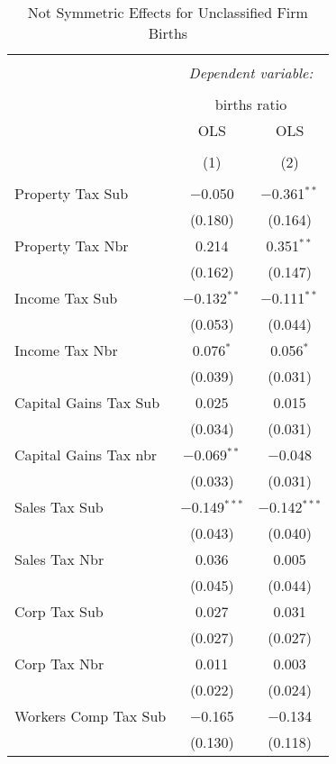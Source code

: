 
\begin{table}[!htbp] \centering 
  \caption{Not Symmetric Effects for  Unclassified Firm Births} 
  \label{99noequality} 
\begin{tabular}{@{\extracolsep{5pt}}lcc} 
\\[-1.8ex]\hline 
\hline \\[-1.8ex] 
 & \multicolumn{2}{c}{\textit{Dependent variable:}} \\ 
\cline{2-3} 
\\[-1.8ex] & \multicolumn{2}{c}{births ratio} \\ 
 & OLS & OLS \\ 
\\[-1.8ex] & (1) & (2)\\ 
\hline \\[-1.8ex] 
 Property Tax Sub & $-$0.050 & $-$0.361$^{**}$ \\ 
  & (0.180) & (0.164) \\ 
  Property Tax Nbr & 0.214 & 0.351$^{**}$ \\ 
  & (0.162) & (0.147) \\ 
  Income Tax Sub & $-$0.132$^{**}$ & $-$0.111$^{**}$ \\ 
  & (0.053) & (0.044) \\ 
  Income Tax Nbr & 0.076$^{*}$ & 0.056$^{*}$ \\ 
  & (0.039) & (0.031) \\ 
  Capital Gains Tax Sub & 0.025 & 0.015 \\ 
  & (0.034) & (0.031) \\ 
  Capital Gains Tax nbr & $-$0.069$^{**}$ & $-$0.048 \\ 
  & (0.033) & (0.031) \\ 
  Sales Tax Sub & $-$0.149$^{***}$ & $-$0.142$^{***}$ \\ 
  & (0.043) & (0.040) \\ 
  Sales Tax Nbr & 0.036 & 0.005 \\ 
  & (0.045) & (0.044) \\ 
  Corp Tax Sub & 0.027 & 0.031 \\ 
  & (0.027) & (0.027) \\ 
  Corp Tax Nbr & 0.011 & 0.003 \\ 
  & (0.022) & (0.024) \\ 
  Workers Comp Tax Sub & $-$0.165 & $-$0.134 \\ 
  & (0.130) & (0.118) \\ 

\end{tabular}
\end{table}
